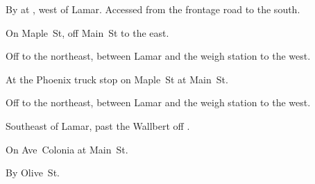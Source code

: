 
\begin{LocationList}

By  at , west of Lamar.
Accessed from the frontage road to the south.

On Maple~St, off   Main~St to the east.

\Location{\GarageHQ \Garage}
Off   to the northeast, between Lamar and the weigh station to the west.

At the Phoenix truck stop on Maple~St at   Main~St.

Off   to the northeast, between Lamar and the weigh station to the west.

Southeast of Lamar, past the Wallbert off  .

\Location{\TruckStop \Gas \Rest \Weigh}
On Ave~Colonia at   Main~St.

By   Olive~St.

\end{LocationList}
